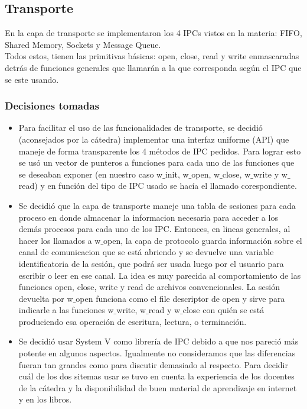 \documentclass[a4paper,10pt]{elsart}
\begin{document}
\subsection{Transporte}
En la capa de transporte se implementaron los 4 IPCs vistos en la materia: FIFO, Shared Memory, Sockets y Message Queue. \\
Todos estos, tienen las primitivas b\'asicas: open, close, read y write enmascaradas detr\'as de funciones generales que llamar\'an a la que corresponda seg\'un el IPC que se este usando.

\subsubsection{Decisiones tomadas}
\begin{itemize}
	\item Para facilitar el uso de las funcionalidades de transporte, se decidi\'o (aconsejados por la c\'atedra) implementar una interfaz uniforme (API) que maneje de forma transparente los 4 m\'etodos de IPC pedidos. Para lograr esto se us\'o un vector de punteros a funciones para cada uno de las funciones que se deseaban exponer (en nuestro caso w$\_$init, w$\_$open, w$\_$close, w$\_$write y w$\_$read) y en funci\'on del tipo de IPC usado se hac\'ia el llamado corespondiente.
	\item Se decidi\'o que la capa de transporte maneje una tabla de sesiones para cada proceso en donde almacenar la informacion necesaria para acceder a los dem\'as procesos para cada uno de los IPC. Entonces, en lineas generales, al hacer los llamados a w$\_$open, la capa de protocolo guarda informaci\'on sobre el canal de comunicacion que se est\'a abriendo y se devuelve una variable identificatoria de la sesi\'on, que podr\'a ser usada luego por el usuario para escribir o leer en ese canal. La idea es muy parecida al comportamiento de las funciones open, close, write y read de archivos convencionales. La sesi\'on devuelta por w$\_$open funciona como el file descriptor de open y sirve para indicarle a las funciones w$\_$write, w$\_$read y w$\_$close con qui\'en se est\'a produciendo esa operaci\'on de escritura, lectura, o terminaci\'on.
	\item Se decidi\'o usar System V como librer\'ia de IPC debido a que nos pareci\'o m\'as potente en algunos aspectos. Igualmente no consideramos que las diferencias fueran tan grandes como para discutir demasiado al respecto. Para decidir cu\'al de los dos sitemas usar se tuvo en cuenta la experiencia de los docentes de la c\'atedra y la disponibilidad de buen material de aprendizaje en internet y en los libros.

\end{itemize}
\end{document}
